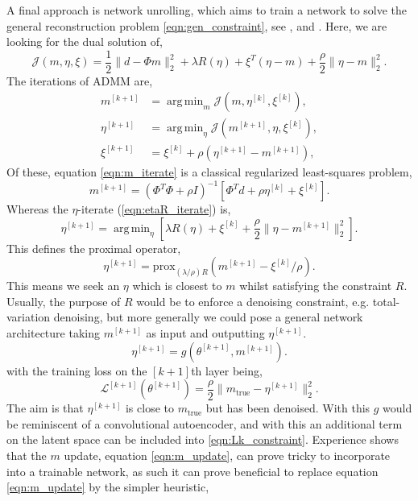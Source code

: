 \documentclass[12pt]{article}
\DeclareMathOperator*{\argmin}{arg\,min}
\begin{document}
A final approach is network unrolling, which aims to train a network to solve the general reconstruction problem \ref{eqn:gen_constraint}, see \cite{monga}, \cite{lista} and \cite{admmnet}. Here, we are looking for the dual solution of,
\begin{equation}
\mathcal{J}(m,\eta, \xi) = \frac{1}{2}\| d - \Phi m\|_2^2 +\lambda R(\eta) +\xi^T(\eta - m)+\frac{\rho}{2}\|\eta -m\|_2^2. \label{eqn:m_eta_dual}
\end{equation}
The iterations of ADMM \cite{admm} are,
\begin{align}
m^{[k+1]}&=\argmin_{m} \mathcal{J}(m,\eta^{[k]},\xi^{[k]}),\label{eqn:m_iterate}\\
\eta^{[k+1]}&=\argmin_{\eta} \mathcal{J}(m^{[k+1]},\eta, \xi^{[k]}),\label{eqn:etaR_iterate}\\
\xi^{[k+1]}&=\xi^{[k]}+\rho(\eta^{[k+1]}-m^{[k+1]}),\label{eqn:xiR_iterate}
\end{align} 
Of these, equation \ref{eqn:m_iterate} is a classical regularized least-squares problem,
\begin{equation}
m^{[k+1]}=\left(\Phi^T\Phi + \rho I\right)^{-1}\left[\Phi^T d+\rho \eta^{[k]}+\xi^{[k]}\right].\label{eqn:m_update}
\end{equation}
Whereas the $\eta$-iterate (\ref{eqn:etaR_iterate}) is,
\begin{equation}
\eta^{[k+1]}=\argmin_{\eta} \left[\lambda R(\eta) +\xi^{[k]} + \frac{\rho}{2}\|\eta -m^{[k+1]}\|_2^2\right].
\end{equation}
This defines the proximal operator,
\begin{equation}
\eta^{[k+1]}=\mathrm{prox}_{(\lambda/\rho)R}(m^{[k+1]}-\xi^{[k]}/\rho).
\end{equation}
This means we seek an $\eta$ which is closest to $m$ whilst satisfying the constraint $R$. Usually, the purpose of $R$ would be to enforce a denoising constraint, e.g. total-variation denoising, but more generally we could pose a general network architecture taking $m^{[k+1]}$ as input and outputting $ \eta^{[k+1]}$. 
\begin{equation}
\eta^{[k+1]}=g(\theta^{[k+1]}, m^{[k+1]}).\label{eqn:Netakp1}
\end{equation}
with the training loss on the $[k+1]$th layer being,
\begin{equation}
\mathcal{L}^{[k+1]}(\theta^{[k+1]})=\frac{\rho}{2}\|m_{\textrm{true}}-\eta^{[k+1]}\|_2^2.\label{eqn:Lk_constraint}
\end{equation}
The aim is that $\eta^{[k+1]}$ is close to $m_{\textrm{true}}$ but has been denoised. With this $g$ would be reminiscent of a convolutional autoencoder, and with this an additional term on the latent space can be included into \ref{eqn:Lk_constraint}. Experience shows that the $m$ update, equation \ref{eqn:m_update}, can prove tricky to incorporate into a trainable network, as such it can prove beneficial to replace equation \ref{eqn:m_update} by the simpler heuristic,
\end{document}
